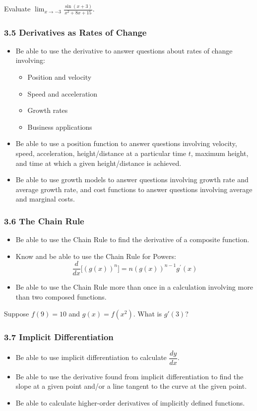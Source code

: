 \documentclass[14pt]{beamer}
\begin{document}
\begin{frame}
\frametitle{}
\begin{exe} Evaluate $\displaystyle\lim_{x\to -3}\frac{\sin{(x+3)}}{x^2+8x+15}$. \end{exe}
\end{frame}

\begin{frame}
\frametitle{3.5 Derivatives as Rates of Change}
\footnotesize
\begin{itemize}
\item Be able to use the derivative to answer questions about rates of change involving:
	\begin{itemize}
	\footnotesize
	\item Position and velocity
	\item Speed and acceleration
	\item Growth rates
	\item Business applications
	\end{itemize}
\item Be able to use a position function to answer questions involving velocity, speed, acceleration, height/distance at a particular time $t$, maximum height, and time at which a given height/distance is achieved.
\item Be able to use growth models to answer questions involving growth rate and average growth rate, and cost functions to answer questions involving average and marginal costs.
\end{itemize}
\end{frame}

\begin{frame}
\frametitle{3.6 The Chain Rule}
\footnotesize
\begin{itemize}
\item Be able to use the Chain Rule to find the derivative of a composite function.
\item Know and be able to use the Chain Rule for Powers: $$\dfrac{d}{dx} \big[ (g(x))^n \big] = n(g(x))^{n-1} g^{\prime}(x)$$
\item Be able to use the Chain Rule more than once in a calculation involving more than two composed functions.
\end{itemize}
\begin{exe} Suppose $f(9)=10$ and $g(x)=f(x^2)$.  What is $g'(3)$? \end{exe}
\end{frame}

\begin{frame}
\frametitle{3.7 Implicit Differentiation}
\small
\begin{itemize}
\item Be able to use implicit differentiation to calculate $\dfrac{dy}{dx}.$
\item Be able to use the derivative found from implicit differentiation to find the slope at a given point and/or a line tangent to the curve at the given point.
\item Be able to calculate higher-order derivatives of implicitly defined functions.
\end{itemize}
\end{frame}
\end{document}
